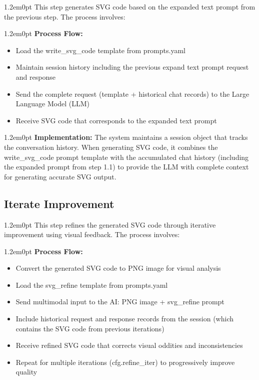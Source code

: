 \documentclass[10pt,a4paper]{article}
\newenvironment{bodytext}{\begin{adjustwidth}{1.2em}{0pt}}{\end{adjustwidth}}
\begin{document}
\begin{bodytext}
This step generates SVG code based on the expanded text prompt from the previous step. The process involves:
\end{bodytext}

\begin{bodytext}
\textbf{Process Flow:}
\begin{itemize}
\item Load the write\_svg\_code template from prompts.yaml
\item Maintain session history including the previous expand text prompt request and response
\item Send the complete request (template + historical chat records) to the Large Language Model (LLM)
\item Receive SVG code that corresponds to the expanded text prompt
\end{itemize}
\end{bodytext}

\begin{bodytext}
\textbf{Implementation:} The system maintains a session object that tracks the conversation history. When generating SVG code, it combines the write\_svg\_code prompt template with the accumulated chat history (including the expanded prompt from step 1.1) to provide the LLM with complete context for generating accurate SVG output.
\end{bodytext}

\subsection{Iterate Improvement}

\begin{bodytext}
This step refines the generated SVG code through iterative improvement using visual feedback. The process involves:
\end{bodytext}

\begin{bodytext}
\textbf{Process Flow:}
\begin{itemize}
\item Convert the generated SVG code to PNG image for visual analysis
\item Load the svg\_refine template from prompts.yaml
\item Send multimodal input to the AI: PNG image + svg\_refine prompt
\item Include historical request and response records from the session (which contains the SVG code from previous iterations)
\item Receive refined SVG code that corrects visual oddities and inconsistencies
\item Repeat for multiple iterations (cfg.refine\_iter) to progressively improve quality
\end{itemize}
\end{bodytext}
\end{document}
